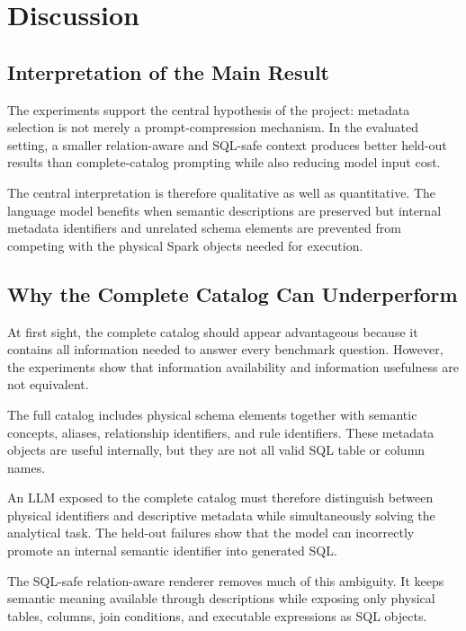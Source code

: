 \section{Discussion}
\label{sec:discussion}

\subsection{Interpretation of the Main Result}

The experiments support the central hypothesis of the project: metadata
selection is not merely a prompt-compression mechanism. In the evaluated
setting, a smaller relation-aware and SQL-safe context produces better
held-out results than complete-catalog prompting while also reducing model
input cost.

The central interpretation is therefore qualitative as well as quantitative.
The language model benefits when semantic descriptions are preserved but
internal metadata identifiers and unrelated schema elements are prevented
from competing with the physical Spark objects needed for execution.


\subsection{Why the Complete Catalog Can Underperform}

At first sight, the complete catalog should appear advantageous because it
contains all information needed to answer every benchmark question. However,
the experiments show that information availability and information usefulness
are not equivalent.

The full catalog includes physical schema elements together with semantic
concepts, aliases, relationship identifiers, and rule identifiers. These
metadata objects are useful internally, but they are not all valid SQL table
or column names.

An LLM exposed to the complete catalog must therefore distinguish between
physical identifiers and descriptive metadata while simultaneously solving
the analytical task. The held-out failures show that the model can incorrectly
promote an internal semantic identifier into generated SQL.

The SQL-safe relation-aware renderer removes much of this ambiguity. It keeps
semantic meaning available through descriptions while exposing only physical
tables, columns, join conditions, and executable expressions as SQL objects.

